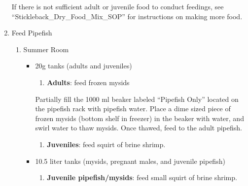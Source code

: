 \documentclass[
  letterpaper,
  DIV=11,
  numbers=noendperiod]{scrreprt}
\providecommand{\tightlist}{%
  \setlength{\itemsep}{0pt}\setlength{\parskip}{0pt}}\usepackage{longtable,booktabs,array}
\begin{document}
\begin{enumerate}
\begin{tcolorbox}
  If there is not sufficient adult or juvenile food to conduct feedings,
  see ``Stickleback\_Dry\_Food\_Mix\_SOP'' for instructions on making
  more food.

  \end{tcolorbox}
\item
  Feed Pipefish

  \begin{enumerate}
  \def\labelenumii{\arabic{enumii}.}
  \item
    Summer Room

    \begin{itemize}
    \item
      20g tanks (adults and juveniles)

      \begin{enumerate}
      \def\labelenumiii{\arabic{enumiii}.}
      \tightlist
      \item
        \textbf{Adults}: feed frozen mysids
      \end{enumerate}

      \begin{tcolorbox}[enhanced jigsaw, toprule=.15mm, breakable, coltitle=black, leftrule=.75mm, title=\textcolor{quarto-callout-warning-color}{\faExclamationTriangle}\hspace{0.5em}{NOTE FOR PREPARING AND FEEDING FROZEN MYSIDS}, bottomrule=.15mm, toptitle=1mm, bottomtitle=1mm, colframe=quarto-callout-warning-color-frame, opacityback=0, colback=white, opacitybacktitle=0.6, colbacktitle=quarto-callout-warning-color!10!white, rightrule=.15mm, titlerule=0mm, arc=.35mm, left=2mm]

      Partially fill the 1000 ml beaker labeled ``Pipefish Only''
      located on the pipefish rack with pipefish water. Place a dime
      sized piece of frozen mysids (bottom shelf in freezer) in the
      beaker with water, and swirl water to thaw mysids. Once thawed,
      feed to the adult pipefish.

      \end{tcolorbox}

      \begin{enumerate}
      \def\labelenumiii{\arabic{enumiii}.}
      \setcounter{enumiii}{1}
      \tightlist
      \item
        \textbf{Juveniles}: feed squirt of brine shrimp.
      \end{enumerate}
    \item
      10.5 liter tanks (mysids, pregnant males, and juvenile pipefish)

      \begin{enumerate}
      \def\labelenumiii{\arabic{enumiii}.}
      \tightlist
      \item
        \textbf{Juvenile pipefish/mysids}: feed small squirt of brine
        shrimp.
      \end{enumerate}
    \end{itemize}
  \end{enumerate}
\end{enumerate}
\end{document}
